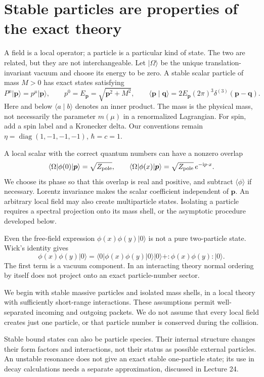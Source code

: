 \documentclass[11pt]{article}
\newcommand{\ii}{\mathrm i}
\newcommand{\diag}{\operatorname{diag}}
\newcommand{\vac}{\lvert0\rangle}
\newcommand{\ket}[1]{\lvert#1\rangle}
\newcommand{\bra}[1]{\langle#1\rvert}
\newcommand{\braket}[2]{\langle#1\mid#2\rangle}
\newcommand{\Zp}{Z_{\rm pole}}
\begin{document}
\section{Stable particles are properties of the exact theory}
A field is a local operator; a particle is a particular kind of state.
The two are related, but they are not interchangeable. Let \(\ket{\Omega}\)
be the unique translation-invariant vacuum and choose its energy to be zero.
A stable scalar particle of mass \(M>0\) has exact states satisfying
\begin{equation}
 P^\mu\ket{\bm p}=p^\mu\ket{\bm p},\qquad
 p^0=E_{\bm p}=\sqrt{\bm p^2+M^2},\qquad
 \braket{\bm p}{\bm q}=2E_{\bm p}(2\pi)^3\delta^{(3)}(\bm p-\bm q).
 \label{eq:oneparticle}
\end{equation}
Here and below \(\braket{a}{b}\) denotes an inner product.
The mass is the physical mass, not necessarily the parameter \(m(\mu)\)
in a renormalized Lagrangian. For spin, add a spin label and a Kronecker delta.
Our conventions remain \(\eta=\diag(1,-1,-1,-1)\), \(\hbar=c=1\).

A local scalar with the correct quantum numbers can have a nonzero overlap
\begin{equation}
 \bra{\Omega}\phi(0)\ket{\bm p}=\sqrt{\Zp},\qquad
 \bra{\Omega}\phi(x)\ket{\bm p}=\sqrt{\Zp}\,e^{-\ii p\cdot x}.
 \label{eq:overlap}
\end{equation}
We choose its phase so that this overlap is real and positive, and subtract
\(\langle\phi\rangle\) if necessary. Lorentz invariance makes the scalar
coefficient independent of \(\bm p\). An arbitrary local field may also
create multiparticle states. Isolating a particle requires a spectral
projection onto its mass shell, or the asymptotic procedure developed below.

Even the free-field expression \(\phi(x)\phi(y)\vac\) is not a pure
two-particle state. Wick's identity gives
\begin{equation}
 \phi(x)\phi(y)\vac=
 \langle0|\phi(x)\phi(y)|0\rangle\vac
 +:\!\phi(x)\phi(y)\!:\vac .
\end{equation}
The first term is a vacuum component. In an interacting theory normal
ordering by itself does not project onto an exact particle-number sector.

\begin{keyidea}
We begin with stable massive particles and isolated mass shells, in a
local theory with sufficiently short-range interactions. These assumptions
permit well-separated incoming and outgoing packets. We do not assume
that every local field creates just one particle, or that particle number
is conserved during the collision.
\end{keyidea}
Stable bound states can also be particle species. Their internal structure
changes their form factors and interactions, not their status as possible
external particles. An unstable resonance does not give an exact stable
one-particle state; its use in decay calculations needs a separate
approximation, discussed in Lecture 24.
\end{document}
